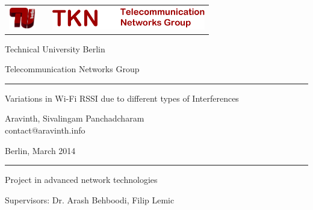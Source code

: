 \documentclass[11pt,a4paper,headinclude,footinclude,chapterprefix=on]{scrreprt}
\makeatletter
\newcommand{\trnumber}{TKN-14}
\newcommand{\trdate}{March 2014}
\newcommand{\trauthor}{Aravinth, Sivalingam Panchadcharam}
\newcommand{\tremail}{contact@aravinth.info}
\newcommand{\trtitle}{Variations in Wi-Fi RSSI due to different types of Interferences}
\makeatother
\begin{document}


{ \sffamily

\thispagestyle{empty} 
\begin{tabularx}
	{\columnwidth}{cXc} 
	\includegraphics[height=1cm]{Images/TU-Logo-3D-rot.pdf} & & 
	\includegraphics[height=1cm]{Images/tknlogo.pdf} \\
\end{tabularx}

\vspace{1.0cm} 
\begin{center}
	{\huge 
	\noindent Technical University Berlin
	
	\vspace{0.5cm}
	
	\noindent Telecommunication Networks Group 
	\begin{center}
		\rule{15.5cm}{0.4pt} 
	\end{center}
	} 
\end{center}
\begin{minipage}
	[][11.0cm][c]{14.5cm} {\Huge 
	\begin{center}
		\trtitle 
	\end{center}
	\begin{center}
		\trauthor \\
		{\Large \tremail} 
	\end{center}
	\begin{center}
		Berlin, \trdate 
	\end{center}
	
	\vspace{0.5cm}
	
	}
	
\end{minipage}

\setlength{\fboxrule}{0.4pt} \setlength{\fboxsep}{0.4pt} 
\begin{center}
	
	\rule{15.5cm}{0.4pt}
	
	\vspace{0.5cm}
	
	{\huge {Project in advanced network technologies}}
	
	\vspace{0.5cm}
	
	{\huge Supervisors: Dr. Arash Behboodi, Filip Lemic}
	
	\vspace{0.5cm} 
\end{center}
}
\end{document}
